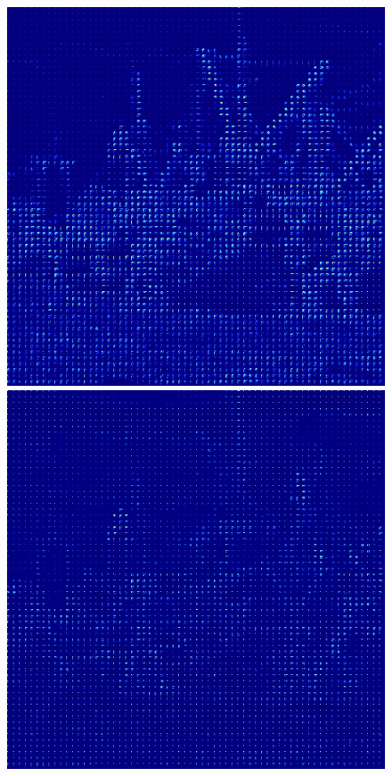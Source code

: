 \documentclass[12pt]{report}
\begin{document}
\begin{figure}[H]
\begin{center}
\includegraphics[scale=0.25]{../ImageRes/blockdct_transform_0.jpg} 
\includegraphics[scale=0.25]{../ImageRes/blockdct_transform_1.jpg} 

\end{center}
\end{figure}
\end{document}
